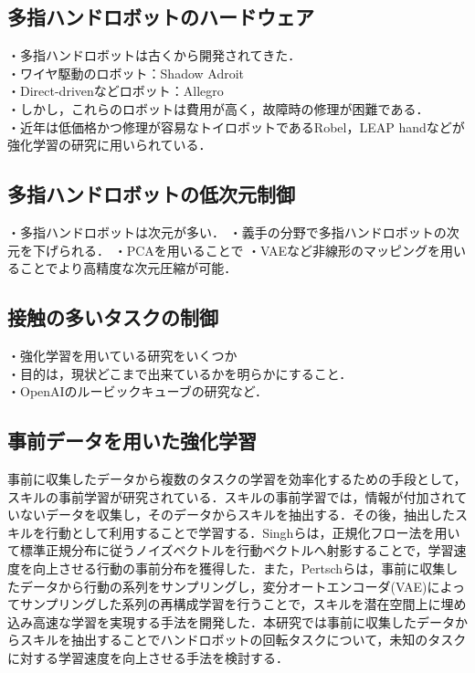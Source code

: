 \documentclass[dvipdfmx]{ampbt_nomag}
\begin{document}
\subsection{多指ハンドロボットのハードウェア}
・多指ハンドロボットは古くから開発されてきた．\\
  ・ワイヤ駆動のロボット：Shadow Adroit\cite{kumar2014real}\\
  ・Direct-drivenなどロボット：Allegro\\
・しかし，これらのロボットは費用が高く，故障時の修理が困難である．\\
・近年は低価格かつ修理が容易なトイロボットであるRobel\cite{ahn2020robel}，LEAP hand\cite{shaw2023leap}などが強化学習の研究に用いられている．\\

\subsection{多指ハンドロボットの低次元制御}
・多指ハンドロボットは次元が多い．
・義手の分野で多指ハンドロボットの次元を下げられる．
・PCAを用いることで
・VAEなど非線形のマッピングを用いることでより高精度な次元圧縮が可能．


\subsection{接触の多いタスクの制御}
・強化学習を用いている研究をいくつか\\
・目的は，現状どこまで出来ているかを明らかにすること．\\
・OpenAIのルービックキューブの研究など．\\

\subsection{事前データを用いた強化学習}
事前に収集したデータから複数のタスクの学習を効率化するための手段として，スキルの事前学習が研究されている．スキルの事前学習では，情報が付加されていないデータを収集し，そのデータからスキルを抽出する．その後，抽出したスキルを行動として利用することで学習する．Singhらは，正規化フロー法\cite{dinh2016density}を用いて標準正規分布に従うノイズベクトルを行動ベクトルへ射影することで，学習速度を向上させる行動の事前分布を獲得した\cite{singh2020parrot}．また，Pertschらは，事前に収集したデータから行動の系列をサンプリングし，変分オートエンコーダ(VAE)によってサンプリングした系列の再構成学習を行うことで，スキルを潜在空間上に埋め込み高速な学習を実現する手法を開発した\cite{pertsch2021accelerating}．本研究では事前に収集したデータからスキルを抽出することでハンドロボットの回転タスクについて，未知のタスクに対する学習速度を向上させる手法を検討する．
\end{document}
